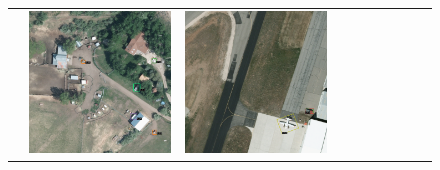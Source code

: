 \begin{figure}[h!]
\begin{tabularx}{\textwidth}{c|*{9}{X}}
    & \includegraphics[trim={850pt 110pt 80pt 830pt},clip,width=\linewidth]{images/015Results/01abb_vs_obb/comp_images/aab_old/523.png}
    &  \includegraphics[trim={650pt 120pt 170pt 720pt},clip,width=\linewidth]{images/015Results/01abb_vs_obb/comp_images/aab_old/487.png}

\end{tabularx}
\end{figure}

